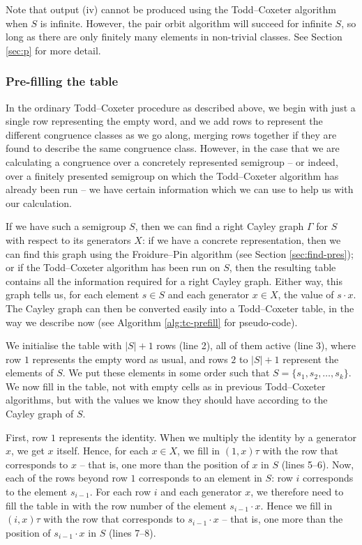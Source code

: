 Note that output (iv) cannot be produced using the Todd--Coxeter algorithm when $S$ is
infinite.  However, the pair orbit algorithm will succeed for infinite $S$, so
long as there are only finitely many elements in non-trivial classes.  See
Section \ref{sec:p} for more detail.

\subsubsection{Pre-filling the table}
\label{sec:tc-prefill}
In the ordinary Todd--Coxeter procedure as described above, we begin with just a
single row representing the empty word, and we add rows to represent the
different congruence classes as we go along, merging rows together if they are
found to describe the same congruence class.  However, in the case that we are
calculating a congruence over a concretely represented semigroup -- or indeed, over a finitely
presented semigroup on which the Todd--Coxeter algorithm has already been run -- we have certain
information which we can use to help us with our calculation.

If we have such a semigroup $S$, then we can find a right Cayley graph $\Gamma$
for $S$ with respect to its generators $X$: if we have a concrete representation, then we can find
this graph using the Froidure--Pin algorithm (see Section \ref{sec:find-pres});
or if the Todd--Coxeter algorithm has been run on $S$, then the resulting table contains all
the information required for a right Cayley graph.  Either way, this graph tells us, for
each element $s \in S$ and each generator $x \in X$, the value of $s \cdot x$.
The Cayley graph can then be converted easily into a Todd--Coxeter table, in the
way we describe now (see Algorithm \ref{alg:tc-prefill} for pseudo-code).

We initialise the table with $|S| + 1$ rows (line 2), all of them active (line
3), where row $1$ represents the empty word as usual, and rows $2$ to $|S| + 1$
represent the elements of $S$.  We put these elements in some order such that
$S = \{s_1, s_2, \ldots, s_k\}$.  We now fill in the table, not with empty cells
as in previous Todd--Coxeter algorithms, but with the values we know they should
have according to the Cayley graph of $S$.

First, row $1$ represents the identity.  When we multiply the identity by a
generator $x$, we get $x$ itself.  Hence, for each $x \in X$, we fill in
$(1, x)\tau$ with the row that corresponds to $x$ -- that is, one more than the
position of $x$ in $S$ (lines 5--6).  Now, each of the rows beyond row $1$
corresponds to an element in $S$: row $i$ corresponds to the element $s_{i-1}$.
For each row $i$ and each generator $x$, we therefore need to fill the table in
with the row number of the element $s_{i-1} \cdot x$.  Hence we fill in
$(i, x)\tau$ with the row that corresponds to $s_{i-1} \cdot x$ -- that is, one
more than the position of $s_{i-1} \cdot x$ in $S$ (lines 7--8).

